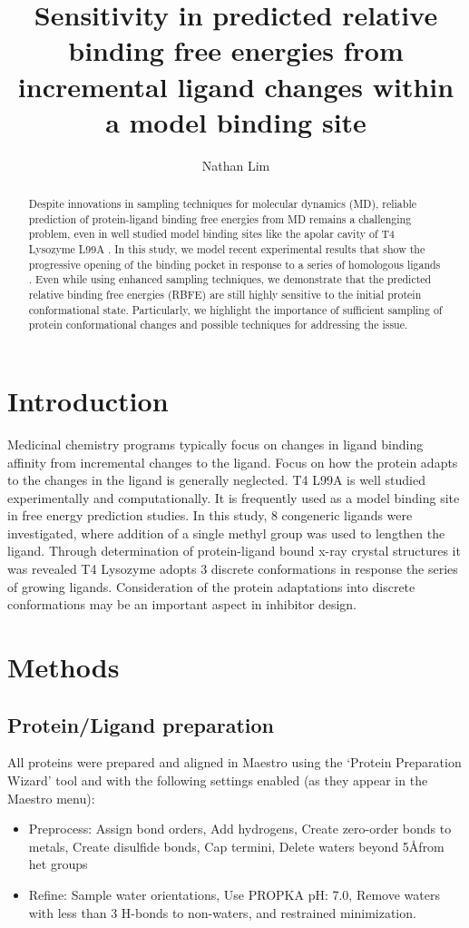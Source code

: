 \documentclass[journal=jctcce,manuscript=article]{achemso}
\author{Nathan Lim}
\affiliation[University of California, Irvine]
{Department of Pharmaceutical Sciences}
\title{Sensitivity in predicted relative binding free energies from incremental ligand changes within a model binding site}
\begin{document}
\begin{abstract}
Despite innovations in sampling techniques for molecular dynamics (MD), reliable prediction of protein-ligand binding free energies from MD remains a challenging problem, even in well studied model binding sites like the apolar cavity of T4 Lysozyme L99A \cite{Boyce2009}.
In this study, we model recent experimental results that show the progressive opening of the binding pocket in response to a series of homologous ligands \cite{Merski2015}.
Even while using enhanced sampling techniques, we demonstrate that the predicted relative binding free energies (RBFE) are still highly sensitive to the initial protein conformational state.
Particularly, we highlight the importance of sufficient sampling of protein conformational changes and possible techniques for addressing the issue.
\end{abstract}

\pagebreak

\section{Introduction}
Medicinal chemistry programs typically focus on changes in ligand binding affinity from incremental changes to the ligand.
Focus on how the protein adapts to the changes in the ligand is generally neglected.
T4 L99A is well studied experimentally and computationally.
It is frequently used as a model binding site in free energy prediction studies.
In this study, 8 congeneric ligands were investigated, where addition of a single methyl group was used to lengthen the ligand.
Through determination of protein-ligand bound x-ray crystal structures it was revealed T4 Lysozyme adopts 3 discrete conformations in response the series of growing ligands.
Consideration of the protein adaptations into discrete conformations may be an important aspect in inhibitor design.

\section{Methods}
\subsection*{Protein/Ligand preparation}
All proteins were prepared and aligned in Maestro\cite{Maestro} using the `Protein Preparation Wizard'\cite{ProteinPrepWizSoftware,Epik,Impact,Prime,ProteinPrepWizPaper} tool and with the following settings enabled (as they appear in the Maestro menu):
   \begin{itemize}
   \item Preprocess: Assign bond orders, Add hydrogens, Create zero-order bonds to metals, Create disulfide bonds, Cap termini, Delete waters beyond 5\AA from het groups
   \item Refine: Sample water orientations, Use PROPKA pH: 7.0, Remove waters with less than 3 H-bonds to non-waters, and restrained minimization.
   \end{itemize}
\end{document}

